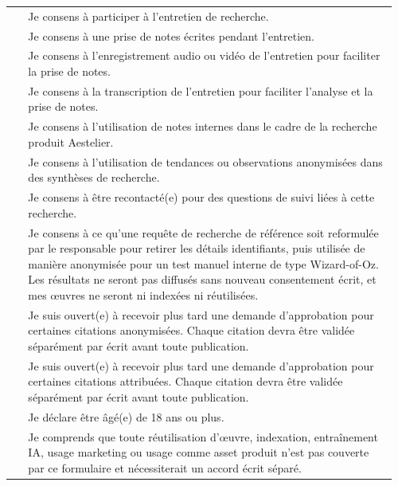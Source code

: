 \documentclass[10pt,a4paper]{article}
\newcommand{\checkbox}{\fbox{\rule{0pt}{0.7em}\hspace{0.7em}}}
\begin{document}
\begin{longtable}{@{}>{\raggedright\arraybackslash}p{0.045\linewidth}@{\hspace{0.5em}}>{\raggedright\arraybackslash}p{0.91\linewidth}@{}}
\checkbox & Je consens à participer à l'entretien de recherche. \\[0.4em]
\checkbox & Je consens à une prise de notes écrites pendant l'entretien. \\[0.4em]
\checkbox & Je consens à l'enregistrement audio ou vidéo de l'entretien pour faciliter la prise de notes. \\[0.4em]
\checkbox & Je consens à la transcription de l'entretien pour faciliter l'analyse et la prise de notes. \\[0.4em]
\checkbox & Je consens à l'utilisation de notes internes dans le cadre de la recherche produit Aestelier. \\[0.4em]
\checkbox & Je consens à l'utilisation de tendances ou observations anonymisées dans des synthèses de recherche. \\[0.4em]
\checkbox & Je consens à être recontacté(e) pour des questions de suivi liées à cette recherche. \\[0.4em]
\checkbox & Je consens à ce qu'une requête de recherche de référence soit reformulée par le responsable pour retirer les détails identifiants, puis utilisée de manière anonymisée pour un test manuel interne de type Wizard-of-Oz. Les résultats ne seront pas diffusés sans nouveau consentement écrit, et mes œuvres ne seront ni indexées ni réutilisées. \\[0.4em]
\checkbox & Je suis ouvert(e) à recevoir plus tard une demande d'approbation pour certaines citations anonymisées. Chaque citation devra être validée séparément par écrit avant toute publication. \\[0.4em]
\checkbox & Je suis ouvert(e) à recevoir plus tard une demande d'approbation pour certaines citations attribuées. Chaque citation devra être validée séparément par écrit avant toute publication. \\[0.4em]
\checkbox & Je déclare être âgé(e) de 18 ans ou plus. \\[0.4em]
\checkbox & Je comprends que toute réutilisation d'œuvre, indexation, entraînement IA, usage marketing ou usage comme asset produit n'est pas couverte par ce formulaire et nécessiterait un accord écrit séparé. \\
\end{longtable}

\newpage
\end{document}
